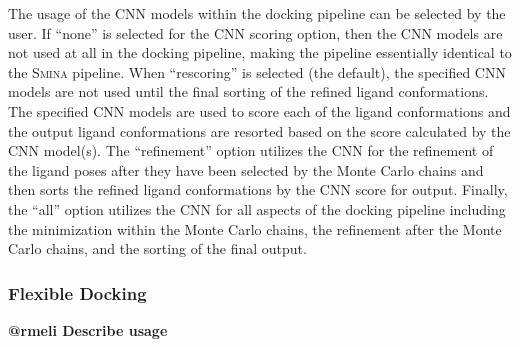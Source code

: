 \documentclass[journal=jcisd8,manuscript=article]{achemso}
\begin{document}
The usage of the CNN models within the docking pipeline can be selected by the user. If ``none'' is selected for the CNN scoring option, then the CNN models are not used at all in the docking pipeline, making the pipeline essentially identical to the \textsc{Smina} pipeline. When ``rescoring'' is selected (the default), the specified CNN models are not used until the final sorting of the refined ligand conformations. The specified CNN models are used to score each of the ligand conformations and the output ligand conformations are resorted based on the score calculated by the CNN model(s). The ``refinement'' option utilizes the CNN for the refinement of the ligand poses after they have been selected by the Monte Carlo chains and then sorts the refined ligand conformations by the CNN score for output. Finally, the ``all'' option utilizes the CNN for all aspects of the docking pipeline including the minimization within the Monte Carlo chains, the refinement after the Monte Carlo chains, and the sorting of the final output. 
\subsubsection{Flexible Docking}

\textbf{@rmeli Describe usage}
\end{document}
